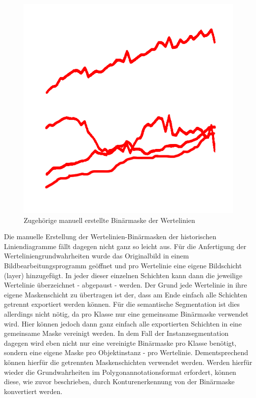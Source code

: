 \begin{figure}[H]
\begin{minipage}{0.475\textwidth}
        \includegraphics[width=\linewidth]{Methodik/img/lines_historical_mask.png}
        \caption{ Zugehörige manuell erstellte Binärmaske der Wertelinien}
        \label{fig:lines_historical_mask}
    \end{minipage}
\end{figure}

Die manuelle Erstellung der Wertelinien-Binärmasken der historischen Liniendiagramme fällt dagegen nicht ganz so leicht aus. Für die Anfertigung der Werteliniengrundwahrheiten wurde das Originalbild in einem Bildbearbeitungsprogramm \cite{photopea} geöffnet und pro Wertelinie eine eigene Bildschicht (layer) hinzugefügt. In jeder dieser einzelnen Schichten kann dann die jeweilige Wertelinie überzeichnet - abgepaust - werden. Der Grund jede Wertelinie in ihre eigene Maskenschicht zu übertragen ist der, dass am Ende einfach alle Schichten getrennt exportiert werden können. Für die semantische Segmentation ist dies allerdings nicht nötig, da pro Klasse nur eine gemeinsame Binärmaske verwendet wird. Hier können jedoch dann ganz einfach alle exportierten Schichten in eine gemeinsame Maske vereinigt werden. In dem Fall der Instanzsegmentation dagegen wird eben nicht nur eine vereinigte Binärmaske pro Klasse benötigt, sondern eine eigene Maske pro Objektinstanz - pro Wertelinie. Dementsprechend können hierfür die getrennten Maskenschichten verwendet werden. Werden hierfür wieder die Grundwahrheiten im Polygonannotationsformat erfordert, können diese, wie zuvor beschrieben, durch Konturenerkennung von der Binärmaske konvertiert werden.